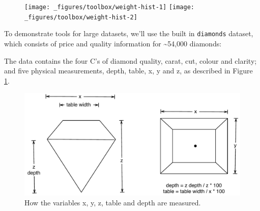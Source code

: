 \begin{figure}[H]
  \texttt{[image: \_figures/toolbox/weight-hist-1]}%
  \texttt{[image: \_figures/toolbox/weight-hist-2]}
\end{figure}


To demonstrate tools for large datasets, we'll use the built in
\texttt{diamonds} dataset, which consists of price and quality
information for \textasciitilde{}54,000 diamonds:

\begin{Shaded}
\begin{Highlighting}[]
\CommentTok{#> }
\end{Highlighting}
\end{Shaded}

The data contains the four C's of diamond quality, carat, cut, colour
and clarity; and five physical measurements, depth, table, x, y and z,
as described in Figure \ref{fig:diamond-dim}.

\begin{figure}[htbp]
  \centering
    \includegraphics[width=0.8\linewidth]{diagrams/diamond-dimensions}
  \caption{How the variables x, y, z, table and depth are measured.}
  \label{fig:diamond-dim}
\end{figure}


